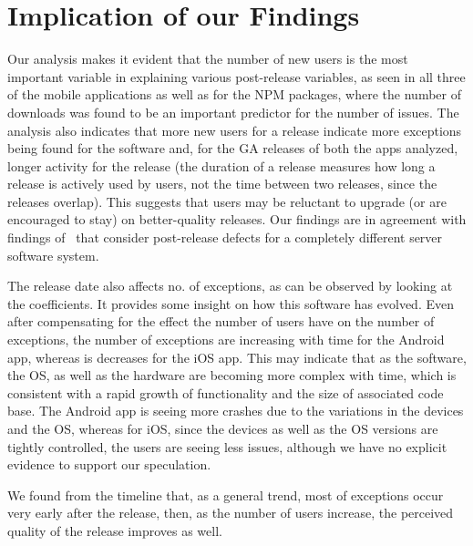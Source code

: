 \documentclass[smallextended]{svjour3}       %
\begin{document}
\vspace{-10pt}
\section{Implication of our Findings}\label{s:implication}

Our analysis makes it evident that the number of new
users  is the most important variable in explaining various post-release variables, as seen in all three of the mobile applications as well as for the NPM packages, where the number of downloads was found to be an important predictor for the number of issues. 
The analysis also indicates that more new users for a release indicate 
more exceptions being found for the software
and, for the GA releases of both the apps analyzed, longer activity for the release (the duration
of a release measures how long a release is actively used by users,
not the time between two releases, since the releases overlap).  This
suggests that users  may be reluctant to upgrade (or are encouraged to stay) on better-quality releases.
 Our findings are in agreement with findings
of~\cite{IQ08,hmps15,mockus2005predictors} that consider 
post-release defects for a completely different server software system.

The release date also affects no. of exceptions, as can be observed by looking 
at the coefficients. It provides some insight on
how this software has evolved.  
Even after compensating for the effect the number of
users have on the number of exceptions, the number of exceptions are
increasing with time for the Android app, whereas is decreases for the iOS app. 
This may indicate that as the software, the OS, as well as the hardware are becoming 
more complex with time, which is consistent with a rapid growth of
functionality and the size of associated code base. The Android app is seeing more crashes due to the variations in the devices and the OS, whereas for iOS, since the devices as well as the OS versions are tightly controlled, the users are seeing less issues, although we have no explicit evidence to support our speculation. 

We found from the timeline that, as a general trend, most of exceptions occur very early after the release, then, as the number of users increase, the perceived quality of the release improves as well.
\end{document}
